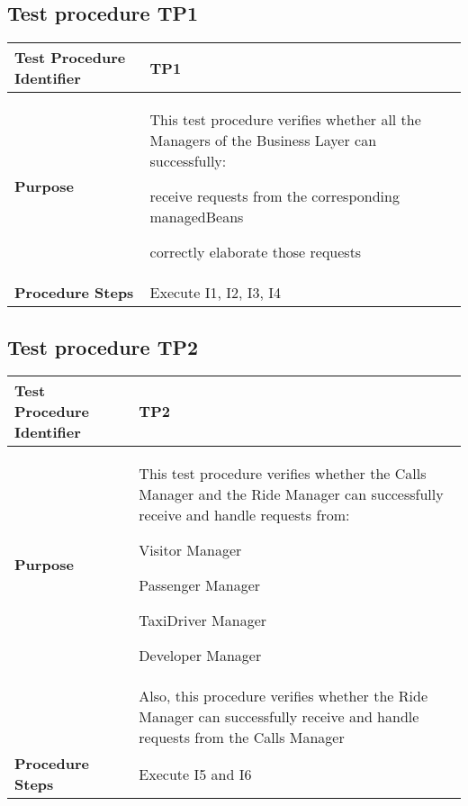 \subsection{Test procedure TP1}

\begin{table}[!htbp]
\begin{center}
\begin{tabular}[t]{p{}p{}}

\hline
\textbf{Test Procedure Identifier} & TP1 \\
\hline
\textbf{Purpose} & This test procedure verifies whether all the Managers of the Business Layer can successfully:
\begin{itemize*}
	\item receive requests from the corresponding managedBeans
	\item correctly elaborate those requests
\end{itemize*} \\
\hline
\textbf{Procedure Steps} & Execute I1, I2, I3, I4 \\
\hline

\end{tabular}
\end{center}
\end{table}


\subsection{Test procedure TP2}

\begin{table}[!htbp]
\begin{center}
\begin{tabular}[t]{p{}p{}}

\hline
\textbf{Test Procedure Identifier} & TP2 \\
\hline
\textbf{Purpose} & This test procedure verifies whether the Calls Manager and the Ride Manager can successfully receive and handle requests from:
\begin{itemize*}
	\item Visitor Manager
	\item Passenger Manager
	\item TaxiDriver Manager
	\item Developer Manager
\end{itemize*} \\
 & Also, this procedure verifies whether the Ride Manager can successfully receive and handle requests from the Calls Manager \\
\hline
\textbf{Procedure Steps} & Execute I5 and I6 \\
\hline

\end{tabular}
\end{center}
\end{table}


